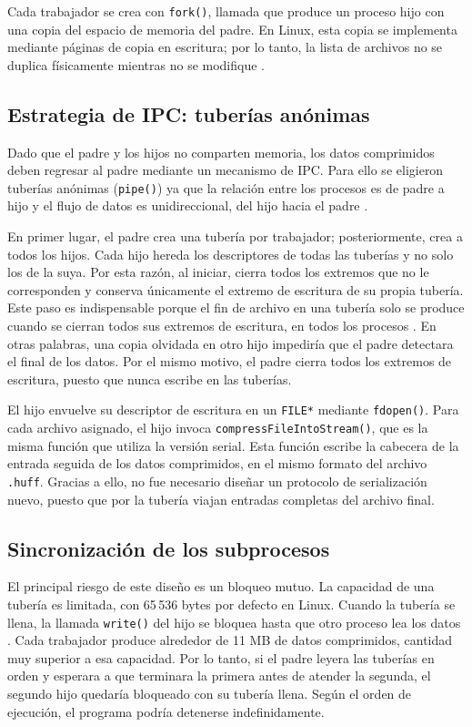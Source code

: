 \documentclass{report}
\begin{document}
Cada trabajador se crea con \texttt{fork()}, llamada que produce un proceso hijo con una copia del espacio de memoria del padre. En Linux, esta copia se implementa mediante páginas de copia en escritura; por lo tanto, la lista de archivos no se duplica físicamente mientras no se modifique \cite{manfork}.

\subsection{Estrategia de IPC: tuberías anónimas}

Dado que el padre y los hijos no comparten memoria, los datos comprimidos deben regresar al padre mediante un mecanismo de IPC. Para ello se eligieron tuberías anónimas (\texttt{pipe()}) ya que la relación entre los procesos es de padre a hijo y el flujo de datos es unidireccional, del hijo hacia el padre \cite{kerrisk10}.

En primer lugar, el padre crea una tubería por trabajador; posteriormente, crea a todos los hijos. Cada hijo hereda los descriptores de todas las tuberías y no solo los de la suya. Por esta razón, al iniciar, cierra todos los extremos que no le corresponden y conserva únicamente el extremo de escritura de su propia tubería. Este paso es indispensable porque el fin de archivo en una tubería solo se produce cuando se cierran todos sus extremos de escritura, en todos los procesos \cite{manpipe}. En otras palabras, una copia olvidada en otro hijo impediría que el padre detectara el final de los datos. Por el mismo motivo, el padre cierra todos los extremos de escritura, puesto que nunca escribe en las tuberías.

El hijo envuelve su descriptor de escritura en un \texttt{FILE*} mediante \texttt{fdopen()}. Para cada archivo asignado, el hijo invoca \texttt{compressFileIntoStream()}, que es la misma función que utiliza la versión serial. Esta función escribe la cabecera de la entrada seguida de los datos comprimidos, en el mismo formato del archivo \texttt{.huff}. Gracias a ello, no fue necesario diseñar un protocolo de serialización nuevo, puesto que por la tubería viajan entradas completas del archivo final.

\subsection{Sincronización de los subprocesos}

El principal riesgo de este diseño es un bloqueo mutuo. La capacidad de una tubería es limitada, con 65\,536 bytes por defecto en Linux. Cuando la tubería se llena, la llamada \texttt{write()} del hijo se bloquea hasta que otro proceso lea los datos \cite{manpipe}. Cada trabajador produce alrededor de 11 MB de datos comprimidos, cantidad muy superior a esa capacidad. Por lo tanto, si el padre leyera las tuberías en orden y esperara a que terminara la primera antes de atender la segunda, el segundo hijo quedaría bloqueado con su tubería llena. Según el orden de ejecución, el programa podría detenerse indefinidamente.
\end{document}
